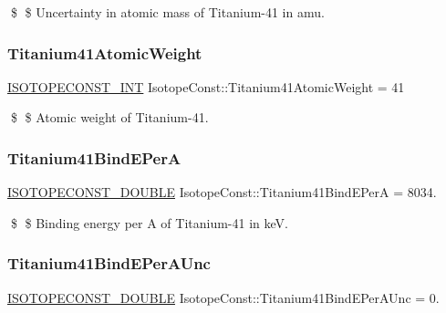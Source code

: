 \$ \$ Uncertainty in atomic mass of Titanium-\/41 in amu. \mbox{\label{group___isotope_const-_titanium-_ti41_gaf224fff0cfcbbf28ae46f0d80af3e9a1}} 
\subsubsection{\texorpdfstring{Titanium41\+Atomic\+Weight}{Titanium41AtomicWeight}}
{\footnotesize\ttfamily \mbox{\hyperlink{group___isotope_const-_macros_ga5f18360b3e99483a35c32d789e62621c}{I\+S\+O\+T\+O\+P\+E\+C\+O\+N\+S\+T\+\_\+\+I\+NT}} Isotope\+Const\+::\+Titanium41\+Atomic\+Weight = 41}

\$ \$ Atomic weight of Titanium-\/41. \mbox{\label{group___isotope_const-_titanium-_ti41_ga70f14ed0a72ee93d0199a71dbbae9ef3}} 
\subsubsection{\texorpdfstring{Titanium41\+Bind\+E\+PerA}{Titanium41BindEPerA}}
{\footnotesize\ttfamily \mbox{\hyperlink{group___isotope_const-_macros_ga8f45a7272ce02c0b4c65c44636ed719a}{I\+S\+O\+T\+O\+P\+E\+C\+O\+N\+S\+T\+\_\+\+D\+O\+U\+B\+LE}} Isotope\+Const\+::\+Titanium41\+Bind\+E\+PerA = 8034.}

\$ \$ Binding energy per A of Titanium-\/41 in keV. \mbox{\label{group___isotope_const-_titanium-_ti41_gae6fce1e32fde96162a7897958c41c2a6}} 
\subsubsection{\texorpdfstring{Titanium41\+Bind\+E\+Per\+A\+Unc}{Titanium41BindEPerAUnc}}
{\footnotesize\ttfamily \mbox{\hyperlink{group___isotope_const-_macros_ga8f45a7272ce02c0b4c65c44636ed719a}{I\+S\+O\+T\+O\+P\+E\+C\+O\+N\+S\+T\+\_\+\+D\+O\+U\+B\+LE}} Isotope\+Const\+::\+Titanium41\+Bind\+E\+Per\+A\+Unc = 0.}


